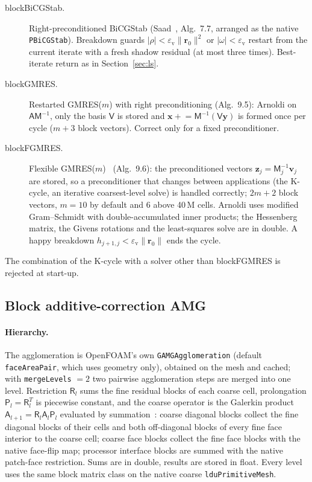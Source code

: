 \documentclass[11pt,a4paper]{article}
\newcommand{\vect}[1]{\mathbf{#1}}
\newcommand{\VSMALL}{\varepsilon_{\mathrm{v}}}
\newcommand{\code}[1]{\texttt{#1}}
\begin{document}
\begin{description}
\item[blockBiCGStab.] Right-preconditioned BiCGStab (Saad~\cite{Saad2003},
  Alg.~7.7, arranged as the native \code{PBiCGStab}). Breakdown guards
  $|\rho|<\VSMALL\|\vect r_0\|^2$ or $|\omega|<\VSMALL$ restart from the
  current iterate with a fresh shadow residual (at most three times).
  Best-iterate return as in Section~\ref{sec:ls}.
\item[blockGMRES.] Restarted GMRES($m$) with right preconditioning
  (Alg.~9.5): Arnoldi on $\mathsf A\mathsf M^{-1}$, only the basis
  $\mathsf V$ is stored and $\vect x\mathrel{+}=\mathsf M^{-1}(\mathsf V\vect y)$
  is formed once per cycle ($m+3$ block vectors). Correct only for a fixed
  preconditioner.
\item[blockFGMRES.] Flexible GMRES($m$)~\cite{Saad1993} (Alg.~9.6): the
  preconditioned vectors $\vect z_j=\mathsf M_j^{-1}\vect v_j$ are stored, so a
  preconditioner that changes between applications (the K-cycle, an
  iterative coarsest-level solve) is handled correctly; $2m+2$ block
  vectors, $m=10$ by default and $6$ above 40\,M cells. Arnoldi uses modified
  Gram--Schmidt with double-accumulated inner products; the Hessenberg
  matrix, the Givens rotations and the least-squares solve are in double. A
  happy breakdown $h_{j+1,j}<\VSMALL\|\vect r_0\|$ ends the cycle.
\end{description}
The combination of the K-cycle with a solver other than blockFGMRES is
rejected at start-up.

\subsection{Block additive-correction AMG}\label{sec:gamg}

\paragraph{Hierarchy.} The agglomeration is OpenFOAM's own
\code{GAMGAgglomeration} (default \code{faceAreaPair}, which uses geometry
only), obtained on the mesh and cached; with \code{mergeLevels} $=2$ two
pairwise agglomeration steps are merged into one level. Restriction
$\mathsf R_l$ sums the fine residual blocks of each coarse cell, prolongation
$\mathsf P_l=\mathsf R_l^T$ is piecewise constant, and the coarse operator is
the Galerkin product $\mathsf A_{l+1}=\mathsf R_l\mathsf A_l\mathsf P_l$
evaluated by summation~\cite{Hutchinson1986,Weiss1999}: coarse diagonal
blocks collect the fine diagonal blocks of their cells and both off-diagonal
blocks of every fine face interior to the coarse cell; coarse face blocks
collect the fine face blocks with the native face-flip map; processor
interface blocks are summed with the native patch-face restriction. Sums are
in double, results are stored in float. Every level uses the same block
matrix class on the native coarse \code{lduPrimitiveMesh}.
\end{document}
